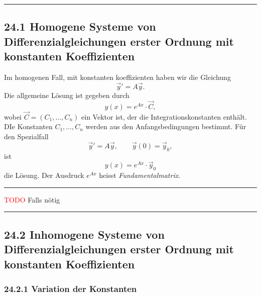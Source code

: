 \documentclass[a4paper,landscape,8pt]{extarticle}
\newcommand{\todo}{\textcolor{red}{TODO }}
\newcommand{\sep}{\vspace{5pt}\noindent\hrule\vspace{5pt}}
\begin{document}
\begin{multicols*}{4}
\sep

\subsection{24.1 Homogene Systeme von Differenzialgleichungen erster Ordnung
mit konstanten Koeffizienten}

Im homogenen Fall, mit konstanten koeffizienten haben wir die Gleichung
\[
\vec{y}' = A\vec{y}.
\]
Die allgemeine Lösung ist gegeben durch
\[
y(x) = e^{Ax}\cdot \vec{C},
\]
wobei $\vec{C}=(C_1,\ldots,C_n)$ ein Vektor ist, der die Integrationskonstanten
enthält. DIe Konstanten $C_1,\ldots,C_n$ werden aus den Anfangsbedingungen
bestimmt. Für den Spezialfall
\[
\vec{y}' = A\vec{y}, \qquad \vec{y}(0) = \vec{y}_0,
\]
ist
\[
y(x) = e^{Ax}\cdot \vec{y}_0
\]
die Lösung. Der Ausdruck $e^{Ax}$ heisst \emph{Fundamentalmatrix}.

\begin{warmup}
\sep

\Bsp \todo Falls nötig

\sep
\end{warmup}

\subsection{24.2 Inhomogene Systeme von Differenzialgleichungen erster Ordnung
mit konstanten Koeffizienten}

\subsubsection{24.2.1 Variation der Konstanten}


\end{multicols*}
\end{document}

